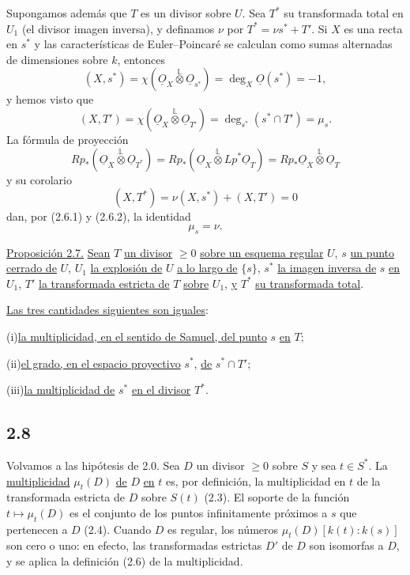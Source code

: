 Supongamos además que $T$ es un divisor sobre $U$. Sea $T^*$ su transformada
total en $U_1$ (el divisor imagen inversa), y definamos $\nu$ por
$T^*=\nu s^*+T'$. Si $X$ es una recta en $s^*$ y las características de
Euler--Poincaré se calculan como sumas alternadas de dimensiones sobre $k$,
entonces
\begin{equation}\tag{2.6.1}
(X,s^*)=
\chi(\underline{O}_X\overset{\mathbb L}{\otimes}\underline{O}_{s^*})
=\deg_X\underline{O}(s^*)=-1,
\end{equation}
y hemos visto que
\begin{equation}\tag{2.6.2}
(X,T')=
\chi(\underline{O}_X\overset{\mathbb L}{\otimes}\underline{O}_{T'})
=\deg_{s^*}(s^*\cap T')=\mu_s.
\end{equation}
La fórmula de proyección
\begin{equation*}
Rp_*(\underline{O}_X\overset{\mathbb L}{\otimes}\underline{O}_{T^*})
=Rp_*(\underline{O}_X\overset{\mathbb L}{\otimes}Lp^*\underline{O}_T)
=Rp_*\underline{O}_X\overset{\mathbb L}{\otimes}\underline{O}_T
\end{equation*}
y su corolario
\begin{equation*}
(X,T^*)=\nu(X,s^*)+(X,T')=0
\end{equation*}
dan, por (2.6.1) y (2.6.2), la identidad
\begin{equation}\tag{2.6.3}
\mu_s=\nu.
\end{equation}

\pageoriginale

\medskip
\noindent\underline{Proposición 2.7.}
\underline{Sean} $T$ \underline{un divisor} $\geq0$ \underline{sobre un esquema
regular} $U$, $s$ \underline{un punto cerrado de} $U$, $U_1$ \underline{la
explosión de} $U$ \underline{a lo largo de} $\{s\}$, $s^*$ \underline{la
imagen inversa de} $s$ \underline{en} $U_1$, $T'$ \underline{la transformada
estricta de} $T$ \underline{sobre} $U_1$, \underline{y} $T^*$ \underline{su
transformada total}.

\underline{Las tres cantidades siguientes son iguales}:

\medskip
\noindent (i)\quad \underline{la multiplicidad, en el sentido de Samuel, del
punto} $s$ \underline{en} $T$;

\noindent (ii)\quad \underline{el grado, en el espacio proyectivo} $s^*$,
\underline{de} $s^*\cap T'$;

\noindent (iii)\quad \underline{la multiplicidad de} $s^*$ \underline{en el
divisor} $T^*$.

\subsection*{2.8}
Volvamos a las hipótesis de 2.0. Sea $D$ un divisor $\geq0$ sobre $S$ y sea
$t\in S^*$. La \underline{multiplicidad} $\mu_t(D)$ \underline{de} $D$
\underline{en} $t$ es, por definición, la multiplicidad en $t$ de la
transformada estricta de $D$ sobre $S(t)$ (2.3). El soporte de la función
$t\mapsto\mu_t(D)$ es el conjunto de los puntos infinitamente próximos a $s$
que pertenecen a $D$ (2.4). Cuando $D$ es regular, los números
$\mu_t(D)[k(t):k(s)]$ son cero o uno: en efecto, las transformadas estrictas
$D'$ de $D$ son isomorfas a $D$, y se aplica la definición (2.6) de la
multiplicidad.

